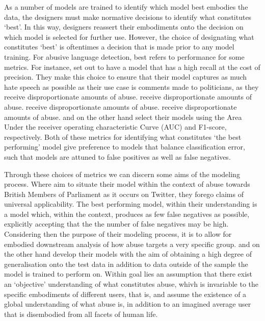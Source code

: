 As a number of models are trained to identify which model best embodies the data, the designers must make normative decisions to identify what constitutes `best'. In this way, designers reassert their embodiments onto the decision on which model is selected for further use. However, the choice of designating what constitutes `best' is oftentimes a decision that is made prior to any model training. For abusive language detection, best refers to performance for some metrics. For instance, \citet{Gorrell:2018} set out to have a model that has a high recall at the cost of precision. They make this choice to ensure that their model captures as much hate speech as possible as their use case is comments made to politicians, as they receive disproportionate amounts of abuse. receive disproportionate amounts of abuse. receive disproportionate amounts of abuse. receive disproportionate amounts of abuse. \citet{Wulczyn:2016} and \citet{Kshirsagar:2018} on the other hand select their models using the Area Under the receiver operating characteristic Curve (AUC) and F1-score, respectively. Both of these metrics for identifying what constitutes `the best performing' model give preference to models that balance classification error, such that models are attuned to false positives as well as false negatives.

Through these choices of metrics we can discern some aims of the modeling process. Where \citet{Gorrell:2018} aim to situate their model within the context of abuse towards British Members of Parliament as it occurs on Twitter, they forego claims of universal applicability. The best performing model, within their understanding is a model which, within the context, produces as few false negatives as possible, explicitly accepting that the the number of false negatives may be high. Considering then the purpose of their modeling process, it is to allow for embodied downstream analysis of how abuse targets a very specific group. \citet{Wulczyn:2016} and \citet{Kshirsagar:2018} on the other hand develop their models with the aim of obtaining a high degree of generalisation onto the test data in addition to data outside of the sample the model is trained to perform on. Within goal lies an assumption that there exist an `objective' understanding of what constitutes abuse, whivh is invariable to the specific embodiments of different users, that is, \citet{Wulczyn:2016} and \citet{Kshirsagar:2018} assume the existence of a global understanding of what abuse is, in addition to an imagined average user that is disembodied from all facets of human life.

